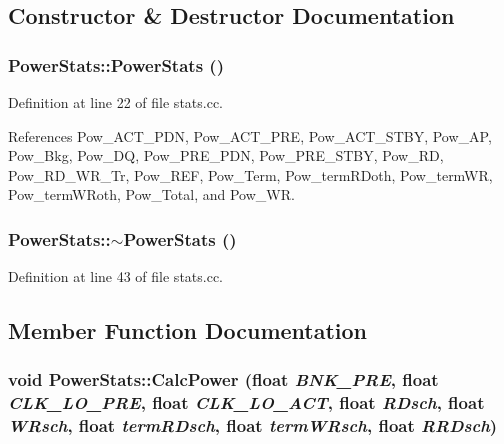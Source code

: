 \subsection{Constructor \& Destructor Documentation}
\subsubsection[{PowerStats}]{\setlength{\rightskip}{0pt plus 5cm}PowerStats::PowerStats ()}\label{classPowerStats_323f1fcdbdbbb1ecb4505dfc596a9533}




Definition at line 22 of file stats.cc.

References Pow\_\-ACT\_\-PDN, Pow\_\-ACT\_\-PRE, Pow\_\-ACT\_\-STBY, Pow\_\-AP, Pow\_\-Bkg, Pow\_\-DQ, Pow\_\-PRE\_\-PDN, Pow\_\-PRE\_\-STBY, Pow\_\-RD, Pow\_\-RD\_\-WR\_\-Tr, Pow\_\-REF, Pow\_\-Term, Pow\_\-termRDoth, Pow\_\-termWR, Pow\_\-termWRoth, Pow\_\-Total, and Pow\_\-WR.
\subsubsection[{$\sim$PowerStats}]{\setlength{\rightskip}{0pt plus 5cm}PowerStats::$\sim$PowerStats ()}\label{classPowerStats_01f056839fcb347db4a272aa970ca2bb}




Definition at line 43 of file stats.cc.

\subsection{Member Function Documentation}
\subsubsection[{CalcPower}]{\setlength{\rightskip}{0pt plus 5cm}void PowerStats::CalcPower (float {\em BNK\_\-PRE}, \/  float {\em CLK\_\-LO\_\-PRE}, \/  float {\em CLK\_\-LO\_\-ACT}, \/  float {\em RDsch}, \/  float {\em WRsch}, \/  float {\em termRDsch}, \/  float {\em termWRsch}, \/  float {\em RRDsch})}\label{classPowerStats_e80a81ee6be435bbea38c09a02f888e7}




